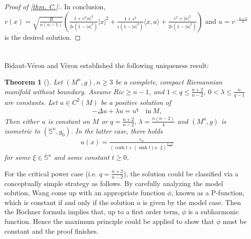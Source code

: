 \documentclass[12pt]{amsart}
\newtheorem{theorem}{Theorem}
\numberwithin{equation}{section}
\numberwithin{lemma}{section}
\numberwithin{proposition}{section}
\numberwithin{corollary}{section}
\numberwithin{remark}{section}
\begin{document}
\begin{proof}[Proof of \cref{thm. C.}:]
In conclusion, $v(x)=\sqrt{\frac{R}{n(n-1)}}
\left(
\frac{1+\epsilon^2|a|^2}{2\epsilon(1-|a|^2)}|x|^2
+\frac{1+\epsilon^2}{\epsilon(1-|a|^2)}\langle x,a\rangle
+\frac{\epsilon^2+|a|^2}{2\epsilon(1-|a|^2)}
\right)$ and $u=v^{-\frac{n-2}{2}}$ is the desired solution.
\end{proof}









\printbibliography[heading=bibintoc]%

\appendix
\section{}\label{appendix}

Bidaut-V\'eron and V\'eron \cite[Theorem 6.1]{BVV91} established the following uniqueness result:
\begin{theorem}[\cite{BVV91}]\label{thm.BVV91}
    Let $(M^n,g), n\geq 3$ be a complete, compact Riemannian manifold without boundary.  Assume $Ric\geq n-1$, and $1<q\leq\frac{n+2}{n-2}$, $0<\lambda\leq \frac{n}{q-1}$ are constants. Let $u\in C^2(M)$ be a positive solution of
    \begin{align}\label{eq. Main equaiton}
        -\Delta u+\lambda u=u^{q}\quad \mathrm{in~}M,
    \end{align}
    Then either $u$ is constant on $M$ or $q=\frac{n+2}{n-2},\,\lambda =\frac{n(n-2)}{4}$ and $(M^n,g)$ is isometric to $(\mathbb{S}^n,g_0)$. In the latter case, there holds
    \begin{align*}
        u(x)=\frac{c_n}{(\cosh t+(\sinh t)x\cdot\xi)^{\frac{n-2}{2}}}
    \end{align*}
    for some $\xi\in \mathbb{S}^{n}$ and some constant $t\geq 0$.
\end{theorem}
For the critical power case (i.e. $q=\frac{n+2}{n-2}$), the solution could be classified via a conceptually simple strategy as follows. By carefully analyzing the model solution, Wang \cite[Section 2]{Wan22} come up with an appropriate function $\phi$, known as a P-function, which is constant if  and only if the solution $u$ is given by the model case. Then the Bochner formula implies that, up to a first order term, $\phi$ is a subharmonic function. Hence the maximum principle could be applied to show that $\phi$ must be constant and the proof finishes.
\end{document}
